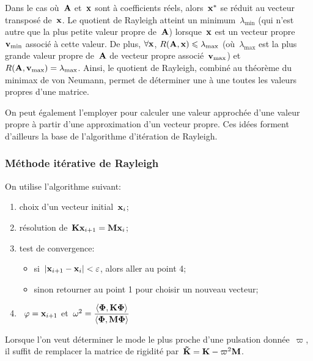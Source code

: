 Dans le cas où~$\MM{A}$ et~$\VV{x}$ sont à coefficients réels, alors~$\VV{x}^{*}$ se réduit au vecteur transposé de~$\VV{x}$.
\medskipvm
Le quotient de Rayleigh atteint un minimum~$\lambda_{\min}$ (qui n'est autre que la plus petite valeur propre de~$\MM{A}$)
lorsque~$\VV{x}$ est un vecteur propre~$\VV{v}_{\min}$ associé à cette valeur.
\medskipvm
De plus, $\forall \VV{x}$, $R(\MM{A}, \VV{x}) \leq \lambda_{\max}$ (où~$\lambda_{\max}$ est la plus grande
valeur propre de~$\MM{A}$ de vecteur propre associé~$\VV{v}_{\max}$) et~$R(\MM{A}, \VV{v}_{\max}) = \lambda_{\max}$.
Ainsi, le quotient de Rayleigh, combiné au théorème du minimax de von Neumann,
permet de déterminer une à une toutes les valeurs propres d'une matrice.

On peut également l'employer pour calculer une valeur approchée d'une valeur propre à partir d'une approximation
d'un vecteur propre.
Ces idées forment d'ailleurs la base de l’algorithme d’itération de Rayleigh.

\medskip
\subsubsection{Méthode itérative de Rayleigh}

On utilise l'algorithme suivant:
\begin{enumerate}
  \item choix d'un vecteur initial~$\VV{x}_i$;
  \item résolution de~$\MM{K}\VV{x}_{i+1} = \MM{M} \VV{x}_i$;
  \item test de convergence:
	\begin{itemize}
	  \item si~$|\VV{x}_{i+1}-\VV{x}_i|<\varepsilon$, alors aller au point 4;
	  \item sinon retourner au point 1 pour choisir un nouveau vecteur;
	\end{itemize}
  \item~$\VV{\varphi}=\VV{x}_{i+1}$ et~$\omega^2=\dfrac{\langle \VV{\Phi}, \MM{K}\VV{\Phi}\rangle}{\langle \VV{\Phi}, \MM{M}\VV{\Phi}\rangle}$
\end{enumerate}
\medskipvm
Lorsque l'on veut déterminer le mode le plus proche d'une pulsation donnée~$\varpi$, il suffit de remplacer
la matrice de rigidité par~$\MM{\tilde{K}}=\MM{K} - \varpi^2 \MM{M}$.
\medskipvm
{}

